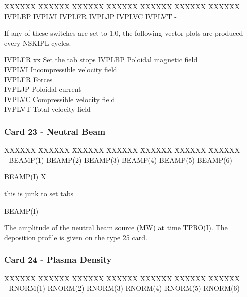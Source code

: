 \begin{tabbing}
XXXXXX \= XXXXXX \= XXXXXX \= XXXXXX \= XXXXXX \= XXXXXX \=
XXXXXX       \\
\footnotesize  IVPLBP  \>\footnotesize IVPLVI  \>\footnotesize IVPLFR \>\footnotesize IVPLJP
\>\footnotesize IVPLVC 
\>\footnotesize IVPLVT \>\footnotesize -
\end{tabbing}
If any of these switches are set to 1.0, the following vector plots are produced every NSKIPL
cycles.
\begin{tabbing}
IVPLFR xx \= Set the tab stops \kill
IVPLBP \> Poloidal magnetic field\\
IVPLVI \> Incompressible velocity field\\
IVPLFR \> Forces\\
IVPLJP \> Poloidal current\\
IVPLVC \> Compressible velocity field\\
IVPLVT \> Total velocity field\\
\end{tabbing}
\newpage \subsubsection{Card 23 - Neutral Beam}
\begin{tabbing}
XXXXXX \= XXXXXX \= XXXXXX \= XXXXXX \= XXXXXX \= XXXXXX \=
XXXXXX       \\
\footnotesize  -  \>\footnotesize BEAMP(1)  \>\footnotesize BEAMP(2) \>\footnotesize
BEAMP(3) \>\footnotesize BEAMP(4) 
\>\footnotesize BEAMP(5) \>\footnotesize BEAMP(6)
\end{tabbing}
\begin{tabbing}
BEAMP(I) X\= \parbox[t]{\width}{this is junk to set tabs} \kill
BEAMP(I) \> \parbox[t]{\width}{The amplitude of the neutral beam source (MW) at time
TPRO(I).  The deposition profile is given on the type 25 card.}
\end{tabbing}
\newpage \subsubsection{Card 24 - Plasma Density}
\begin{tabbing}
XXXXXX \= XXXXXX \= XXXXXX \= XXXXXX \= XXXXXX \= XXXXXX \=
XXXXXX       \\
\footnotesize  -  \>\footnotesize RNORM(1)  \>\footnotesize RNORM(2) \>\footnotesize
RNORM(3) \>\footnotesize RNORM(4) \>\footnotesize RNORM(5) \>\footnotesize RNORM(6)
\end{tabbing}
